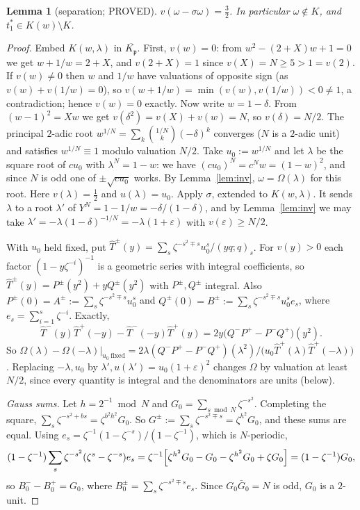 \documentclass[11pt]{article}
\newtheorem{lemma}[theorem]{Lemma}
\theoremstyle{remark}
\begin{document}
\begin{lemma}[separation; PROVED]\label{lem:sep}
$v(\omega-\sigma\omega)=\frac32$. In particular $\omega\notin K$, and $t_1^\ast\in K(w)\setminus K$.
\end{lemma}
\begin{proof}
Embed $K(w,\lambda)$ in $\overline{K_{\mathfrak p}}$. First, $v(w)=0$: from $w^2-(2+X)w+1=0$ we get
$w+1/w=2+X$, and $v(2+X)=1$ since $v(X)=N\ge5>1=v(2)$. If $v(w)\ne0$ then $w$ and $1/w$ have valuations
of opposite sign (as $v(w)+v(1/w)=0$), so $v(w+1/w)=\min(v(w),v(1/w))<0\ne1$, a contradiction; hence
$v(w)=0$ exactly. Now write $w=1-\delta$. From $(w-1)^2=Xw$ we get $v(\delta^2)=v(X)+v(w)=N$, so $v(\delta)=N/2$.
The principal $2$-adic root $w^{1/N}=\sum_k\binom{1/N}{k}(-\delta)^k$ converges ($N$ is a $2$-adic unit) and
satisfies $w^{1/N}\equiv1$ modulo valuation $N/2$. Take $u_0:=w^{1/N}$ and let $\lambda$ be the square root
of $cu_0$ with $\lambda^N=1-w$: we have $(cu_0)^N=c^Nw=(1-w)^2$, and since $N$ is odd one of $\pm\sqrt{cu_0}$
works. By Lemma~\ref{lem:inv}, $\omega=\Omega(\lambda)$ for this root. Here $v(\lambda)=\frac12$ and $u(\lambda)=u_0$.
Apply $\sigma$, extended to $K(w,\lambda)$. It sends $\lambda$ to a root $\lambda'$ of $Y^N=1-1/w=-\delta/(1-\delta)$,
and by Lemma~\ref{lem:inv} we may take $\lambda'=-\lambda(1-\delta)^{-1/N}=-\lambda(1+\varepsilon)$ with
$v(\varepsilon)\ge N/2$.

With $u_0$ held fixed, put $\hat T^\pm(y)=\sum_s\zeta^{-s^2\mp s}u_0^s/(yq;q)_s$. For $v(y)>0$ each factor
$(1-y\zeta^{-i})^{-1}$ is a geometric series with integral coefficients, so
$\hat T^\pm(y)=P^\pm(y^2)+yQ^\pm(y^2)$ with $P^\pm,Q^\pm$ integral. Also
$P^\pm(0)=A^\pm:=\sum_s\zeta^{-s^2\mp s}u_0^s$ and $Q^\pm(0)=B^\pm:=\sum_s\zeta^{-s^2\mp s}u_0^se_s$, where
$e_s=\sum_{i=1}^s\zeta^{-i}$. Exactly,
\[
   \hat T^-(y)\hat T^+(-y)-\hat T^-(-y)\hat T^+(y)=2y\bigl(Q^-P^+-P^-Q^+\bigr)(y^2).
\]
So $\Omega(\lambda)-\Omega(-\lambda)\big|_{u_0\ \mathrm{fixed}}=2\lambda(Q^-P^+-P^-Q^+)(\lambda^2)/\bigl(u_0\hat T^+(\lambda)\hat T^+(-\lambda)\bigr)$.
Replacing $-\lambda,u_0$ by $\lambda',u(\lambda')=u_0(1+\varepsilon)^2$ changes $\Omega$ by valuation at least $N/2$,
since every quantity is integral and the denominators are units (below).

\emph{Gauss sums.} Let $h=2^{-1}\bmod N$ and $G_0=\sum_{s\bmod N}\zeta^{-s^2}$. Completing the square,
$\sum_s\zeta^{-s^2+bs}=\zeta^{b^2h^2}G_0$. So $G^\pm:=\sum_s\zeta^{-s^2\mp s}=\zeta^{h^2}G_0$, and these sums are
equal. Using $e_s=\zeta^{-1}(1-\zeta^{-s})/(1-\zeta^{-1})$, which is $N$-periodic,
\[
   (1-\zeta^{-1})\sum_s\zeta^{-s^2}(\zeta^s-\zeta^{-s})e_s=\zeta^{-1}\Bigl[\zeta^{h^2}G_0-G_0-\zeta^{h^2}G_0+\zeta G_0\Bigr]
   =(1-\zeta^{-1})G_0,
\]
so $B_0^--B_0^+=G_0$, where $B_0^\pm=\sum_s\zeta^{-s^2\mp s}e_s$. Since $G_0\bar G_0=N$ is odd, $G_0$ is a
$2$-unit.


\end{proof}
\end{document}
